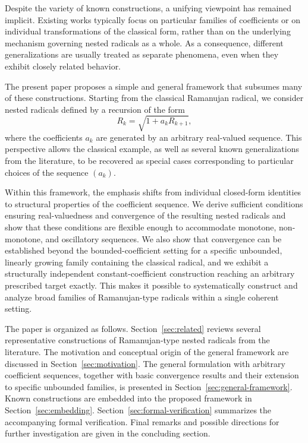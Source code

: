 \documentclass[11pt,a4paper]{amsart}
\theoremstyle{plain}
\theoremstyle{definition}
\theoremstyle{remark}
\begin{document}
Despite the variety of known constructions, a unifying viewpoint has remained implicit. Existing works typically focus on particular families of coefficients or on individual transformations of the classical form, rather than on the underlying mechanism governing nested radicals as a whole. As a consequence, different generalizations are usually treated as separate phenomena, even when they exhibit closely related behavior.

The present paper proposes a simple and general framework that subsumes many of these constructions. Starting from the classical Ramanujan radical, we consider nested radicals defined by a recursion of the form
\[
R_k = \sqrt{1 + a_k R_{k+1}},
\]
where the coefficients \(a_k\) are generated by an arbitrary real-valued sequence. This perspective allows the classical example, as well as several known generalizations from the literature, to be recovered as special cases corresponding to particular choices of the sequence \((a_k)\).

Within this framework, the emphasis shifts from individual closed-form identities to structural properties of the coefficient sequence. We derive sufficient conditions ensuring real-valuedness and convergence of the resulting nested radicals and show that these conditions are flexible enough to accommodate monotone, non-monotone, and oscillatory sequences. We also show that convergence can be established beyond the bounded-coefficient setting for a specific unbounded, linearly growing family containing the classical radical, and we exhibit a structurally independent constant-coefficient construction reaching an arbitrary prescribed target exactly. This makes it possible to systematically construct and analyze broad families of Ramanujan-type radicals within a single coherent setting.

The paper is organized as follows. Section~\ref{sec:related} reviews several representative constructions of Ramanujan-type nested radicals from the literature. The motivation and conceptual origin of the general framework are discussed in Section~\ref{sec:motivation}. The general formulation with arbitrary coefficient sequences, together with basic convergence results and their extension to specific unbounded families, is presented in Section~\ref{sec:general-framework}. Known constructions are embedded into the proposed framework in Section~\ref{sec:embedding}. Section~\ref{sec:formal-verification} summarizes the accompanying formal verification. Final remarks and possible directions for further investigation are given in the concluding section.
\end{document}
